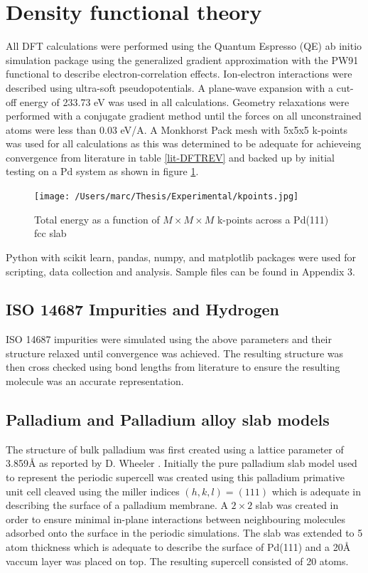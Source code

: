\section{Density functional theory} \label{DFTparams}
All DFT calculations were performed using the Quantum Espresso (QE) \cite{QE-2009, QE-2017, doi:10.1063/5.0005082} ab initio simulation package using the generalized gradient approximation with the PW91 functional to describe electron-correlation effects. Ion-electron interactions were described using ultra-soft pseudopotentials. A plane-wave expansion with a cut-off energy of 233.73 eV was used in all calculations. Geometry relaxations were performed with a conjugate gradient method until the forces on all unconstrained atoms were less than 0.03 eV/A. A Monkhorst Pack mesh with 5x5x5 k-points was used for all calculations as this was determined to be adequate for achieveing convergence from literature in table \ref{lit-DFTREV} and backed up by initial testing on a Pd system as shown in figure \ref{kpoints}.

\begin{figure}
  \centering
  \texttt{[image: /Users/marc/Thesis/Experimental/kpoints.jpg]}
  \caption{Total energy as a function of $M\times M\times M$ k-points across a Pd(111) fcc slab}
  \label{kpoints}
\end{figure}

Python with scikit learn, pandas, numpy, and matplotlib packages were used for scripting, data collection and analysis. Sample files can be found in Appendix 3. 

\subsection{ISO 14687 Impurities and Hydrogen} \label{gassim}
ISO 14687 impurities were simulated using the above parameters and their structure relaxed until convergence was achieved. The resulting structure was then cross checked using bond lengths from literature to ensure the resulting molecule was an accurate representation. 

\subsection{Palladium and Palladium alloy slab models}\label{slabsim}
The structure of bulk palladium was first created using a lattice parameter of 3.859\si{\angstrom} as reported by D. Wheeler \cite{PhysRev.25.753}. Initially the pure palladium slab model used to represent the periodic supercell was created using this palladium primative unit cell cleaved using the miller indices $(h,k,l) = (111)$ which is adequate in describing the surface of a palladium membrane. A $2\times 2$ slab was created in order to ensure minimal in-plane interactions between neighbouring molecules adsorbed onto the surface in the periodic simulations. The slab was extended to 5 atom thickness which is adequate to describe the surface of Pd(111) and a 20\si{\angstrom} vaccum layer was placed on top. The resulting supercell consisted of 20 atoms. 

